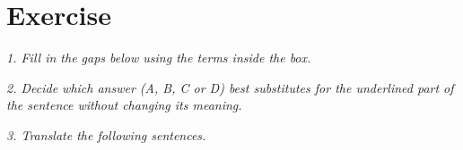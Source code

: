 \documentclass{article}
\begin{document}
\newpage
\section{Exercise}

\noindent \textit{1. Fill in the gaps below using the terms inside the box.}

%
%
%
%
%
%
%
%
%
%
%
%
%
%
%
%
%
%
%
%

\noindent \textit{2. Decide which answer (A, B, C or D) best substitutes for the underlined part of the sentence without changing its meaning.}

%
%
%
%
%
%
%
%
%
%
%
%
%
%
%
%
%
%
%
%

\noindent \textit{3. Translate the following sentences.}
\begin{CJK*}{UTF8}{gbsn}
%
%
%
%
%
%
%
%
%
%
%
%
%
%
%
%
%
%
%
%
\end{CJK*}
\end{document}

